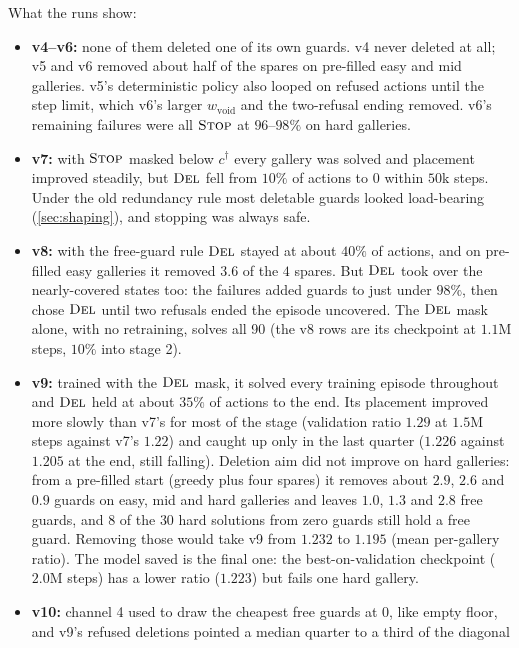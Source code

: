 \documentclass[11pt,a4paper]{article}
\begin{document}
What the runs show:
\begin{itemize}
  \item \textbf{v4--v6:} none of them deleted one of its own guards. v4 never deleted at all;
        v5 and v6 removed about half of the spares on pre-filled easy and mid galleries. v5's
        deterministic policy also looped on refused actions until the step limit, which v6's
        larger $w_{\mathrm{void}}$ and the two-refusal ending removed. v6's remaining failures
        were all $\textsc{Stop}$ at $96$--$98\%$ on hard galleries.
  \item \textbf{v7:} with $\textsc{Stop}$ masked below $c^\dagger$ every gallery was solved and placement
        improved steadily, but $\textsc{Del}$ fell from $10\%$ of actions to $0$ within $50$k steps. Under
        the old redundancy rule most deletable guards looked load-bearing (\cref{sec:shaping}),
        and stopping was always safe.
  \item \textbf{v8:} with the free-guard rule $\textsc{Del}$ stayed at about $40\%$ of actions, and on
        pre-filled easy galleries it removed $3.6$ of the $4$ spares. But $\textsc{Del}$ took over the
        nearly-covered states too: the failures added guards to just under $98\%$, then chose
        $\textsc{Del}$ until two refusals ended the episode uncovered. The $\textsc{Del}$ mask alone, with no retraining, solves all 90 (the
        v8 rows are its checkpoint at $1.1$M steps, $10\%$ into stage 2).
  \item \textbf{v9:} trained with the $\textsc{Del}$ mask, it solved every training episode
        throughout and $\textsc{Del}$ held at about $35\%$ of actions to the end. Its placement improved
        more slowly than v7's for most of the stage (validation ratio $1.29$ at $1.5$M steps
        against v7's $1.22$) and caught up only in the last quarter ($1.226$ against $1.205$ at
        the end, still falling). Deletion aim did not improve on hard galleries: from a
        pre-filled start (greedy plus four spares) it removes about $2.9$, $2.6$ and $0.9$ guards
        on easy, mid and hard galleries and leaves $1.0$, $1.3$ and $2.8$ free guards, and $8$ of
        the $30$ hard solutions from zero guards still hold a free guard. Removing those would
        take v9 from $1.232$ to $1.195$ (mean per-gallery ratio). The model saved is the final
        one: the best-on-validation checkpoint ($2.0$M steps) has a lower ratio ($1.223$) but
        fails one hard gallery.
  \item \textbf{v10:} channel 4 used to draw the cheapest free guards at $0$, like empty
        floor, and v9's refused deletions pointed a median quarter to a third of the diagonal

\end{itemize}
\end{document}
